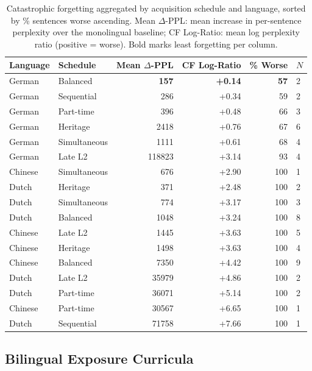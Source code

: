 \begin{table}[t]
  \centering
  \small
  \caption{Catastrophic forgetting aggregated by acquisition schedule and language,
           sorted by \% sentences worse ascending.
           Mean $\Delta$-PPL: mean increase in per-sentence perplexity over the
           monolingual baseline;
           CF Log-Ratio: mean log perplexity ratio (positive = worse).
           Bold marks least forgetting per column.}
  \label{tab:forgetting}
  \begin{tabular}{llrrrl}
    \toprule
    Language & Schedule & Mean $\Delta$-PPL & CF Log-Ratio & \% Worse & $N$ \\
    \midrule
    German & Balanced & \textbf{157} & \textbf{+0.14} & \textbf{57} & 2 \\
    German & Sequential & 286 & +0.34 & 59 & 2 \\
    German & Part-time & 396 & +0.48 & 66 & 3 \\
    German & Heritage & 2418 & +0.76 & 67 & 6 \\
    German & Simultaneous & 1111 & +0.61 & 68 & 4 \\
    German & Late L2 & 118823 & +3.14 & 93 & 4 \\
    \midrule
    Chinese & Simultaneous & 676 & +2.90 & 100 & 1 \\
    \midrule
    Dutch & Heritage & 371 & +2.48 & 100 & 2 \\
    Dutch & Simultaneous & 774 & +3.17 & 100 & 3 \\
    Dutch & Balanced & 1048 & +3.24 & 100 & 8 \\
    \midrule
    Chinese & Late L2 & 1445 & +3.63 & 100 & 5 \\
    Chinese & Heritage & 1498 & +3.63 & 100 & 4 \\
    Chinese & Balanced & 7350 & +4.42 & 100 & 9 \\
    \midrule
    Dutch & Late L2 & 35979 & +4.86 & 100 & 2 \\
    Dutch & Part-time & 36071 & +5.14 & 100 & 2 \\
    \midrule
    Chinese & Part-time & 30567 & +6.65 & 100 & 1 \\
    \midrule
    Dutch & Sequential & 71758 & +7.66 & 100 & 1 \\
    \bottomrule
  \end{tabular}
\end{table}


\subsection{Bilingual Exposure Curricula}


